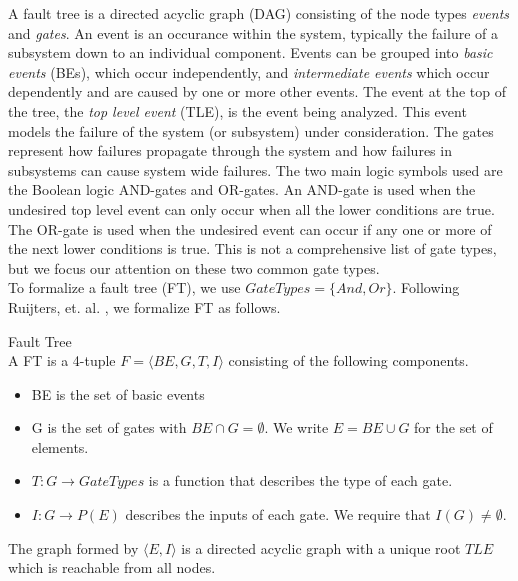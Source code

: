 A fault tree is a directed acyclic graph (DAG) consisting of the node types \textit{events} and \textit{gates}. An event is an occurance within the system, typically the failure of a subsystem down to an individual component. Events can be grouped into \textit{basic events} (BEs), which occur independently, and \textit{intermediate events} which occur dependently and are caused by one or more other events. The event at the top of the tree, the \textit{top level event} (TLE), is the event being analyzed. This event models the failure of the system (or subsystem) under consideration. The gates represent how failures propagate through the system and how failures in subsystems can cause system wide failures. The two main logic symbols used are the Boolean logic AND-gates and OR-gates.
An AND-gate is used when the undesired top level event can only occur when all the lower conditions are true. The OR-gate is used when the undesired event can occur if any one or more of the next lower conditions is true. This is not a comprehensive list of gate types, but we focus our attention on these two common gate types.\\

To formalize a fault tree (FT), we use $GateTypes = \{And, Or\}$. Following Ruijters, et. al. \cite{RuijtersSurvey}, we formalize FT as follows. \\

\begin{definition}Fault Tree\\ 
A FT is a 4-tuple $F = \langle BE, G, T, I \rangle$ consisting of the following components. 
\begin{itemize}
\item BE is the set of basic events
\item G is the set of gates with $BE \cap G = \emptyset$. We write $E = BE \cup G$ for the set of elements.
\item $T: G \to GateTypes$ is a function that describes the type of each gate.
\item $I: G \to P(E)$ describes the inputs of each gate. We require that $I(G) \neq \emptyset$.
\end{itemize}
\end{definition}

The graph formed by $\langle E, I \rangle$ is a directed acyclic graph with a unique root $TLE$ which is reachable from all nodes. \\

